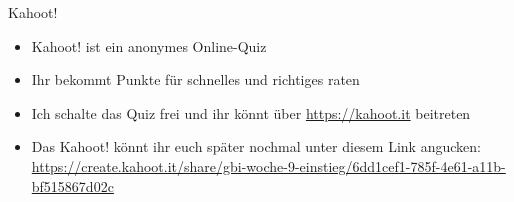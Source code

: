 \framePrevEpisode

\begin{frame}{Kahoot!}
	\begin{itemize}[<+->]
		\item Kahoot! ist ein anonymes Online-Quiz
		\item Ihr bekommt Punkte für schnelles und richtiges raten
		\item Ich schalte das Quiz frei und ihr könnt über \url{https://kahoot.it} beitreten
		\item Das Kahoot! könnt ihr euch später nochmal unter diesem Link angucken: \\
			\url{https://create.kahoot.it/share/gbi-woche-9-einstieg/6dd1cef1-785f-4e61-a11b-bf515867d02c}
	\end{itemize}
\end{frame}


	

